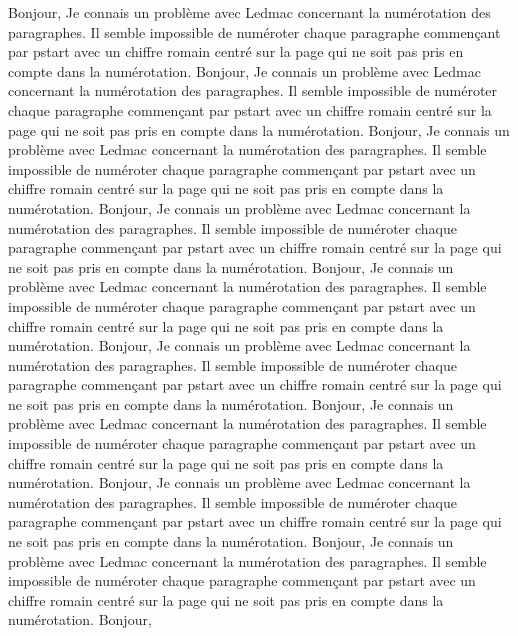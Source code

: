 \documentclass{article}
\begin{document}
\numberpstarttrue
\renewcommand{\thepstart}{\vspace{1cm}{\hfill \Roman{pstart}\hfill} \par\nopagebreak[4]}


\beginnumbering

\pstart Bonjour,
Je connais un problème avec Ledmac concernant la numérotation des paragraphes. Il semble impossible de numéroter chaque paragraphe commençant par pstart avec un chiffre romain centré sur la page qui ne soit pas pris en compte dans la numérotation. Bonjour,
Je connais un problème avec Ledmac concernant la numérotation des paragraphes. Il semble impossible de numéroter chaque paragraphe commençant par pstart avec un chiffre romain centré sur la page qui ne soit pas pris en compte dans la numérotation. Bonjour,
Je connais un problème avec Ledmac concernant la numérotation des paragraphes. Il semble impossible de numéroter chaque paragraphe commençant par pstart avec un chiffre romain centré sur la page qui ne soit pas pris en compte dans la numérotation. Bonjour,
Je connais un problème avec Ledmac concernant la numérotation des paragraphes. Il semble impossible de numéroter chaque paragraphe commençant par pstart avec un chiffre romain centré sur la page qui ne soit pas pris en compte dans la numérotation. Bonjour,
Je connais un problème avec Ledmac concernant la numérotation des paragraphes. Il semble impossible de numéroter chaque paragraphe commençant par pstart avec un chiffre romain centré sur la page qui ne soit pas pris en compte dans la numérotation. Bonjour,
Je connais un problème avec Ledmac concernant la numérotation des paragraphes. Il semble impossible de numéroter chaque paragraphe commençant par pstart avec un chiffre romain centré sur la page qui ne soit pas pris en compte dans la numérotation. Bonjour,
Je connais un problème avec Ledmac concernant la numérotation des paragraphes. Il semble impossible de numéroter chaque paragraphe commençant par pstart avec un chiffre romain centré sur la page qui ne soit pas pris en compte dans la numérotation. Bonjour,
Je connais un problème avec Ledmac concernant la numérotation des paragraphes. Il semble impossible de numéroter chaque paragraphe commençant par pstart avec un chiffre romain centré sur la page qui ne soit pas pris en compte dans la numérotation. Bonjour,
Je connais un problème avec Ledmac concernant la numérotation des paragraphes. Il semble impossible de numéroter chaque paragraphe commençant par pstart avec un chiffre romain centré sur la page qui ne soit pas pris en compte dans la numérotation. \pend
\pstart Bonjour,
\end{document}
